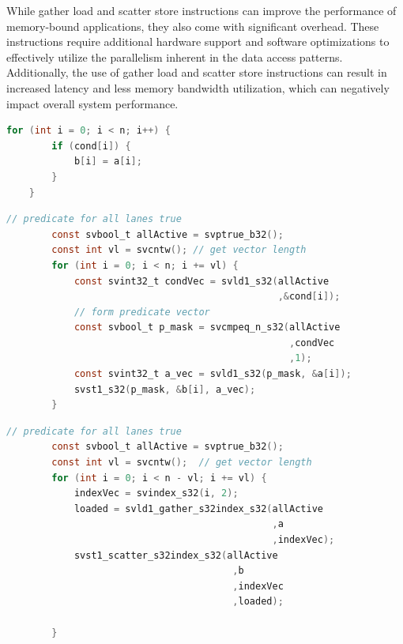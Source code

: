 \documentclass[\main/thesis.tex]{subfiles}
\begin{document}
While gather load and scatter store instructions can improve the performance of memory-bound applications, they also come with significant overhead. These instructions require additional hardware support and software optimizations to effectively utilize the parallelism inherent in the data access patterns. Additionally, the use of gather load and scatter store instructions can result in increased latency and less memory bandwidth utilization, which can negatively impact overall system performance.

\newpage

\begin{lstlisting}[language=C, caption=Scalar Code]
    for (int i = 0; i < n; i++) {
        if (cond[i]) {
            b[i] = a[i];
        }
    }
    \end{lstlisting}
    
    \begin{lstlisting}[language=C,caption=Vectorized Code]
        // predicate for all lanes true
        const svbool_t allActive = svptrue_b32(); 
        const int vl = svcntw(); // get vector length
        for (int i = 0; i < n; i += vl) {
            const svint32_t condVec = svld1_s32(allActive
                                                ,&cond[i]);
            // form predicate vector
            const svbool_t p_mask = svcmpeq_n_s32(allActive 
                                                  ,condVec
                                                  ,1); 
            const svint32_t a_vec = svld1_s32(p_mask, &a[i]);
            svst1_s32(p_mask, &b[i], a_vec); 
        }
    \end{lstlisting}
    
    \begin{lstlisting}[language=C,caption= Code Using Gather/Scatter]
        // predicate for all lanes true
        const svbool_t allActive = svptrue_b32(); 
        const int vl = svcntw();  // get vector length
        for (int i = 0; i < n - vl; i += vl) {
            indexVec = svindex_s32(i, 2);
            loaded = svld1_gather_s32index_s32(allActive
                                               ,a
                                               ,indexVec);
            svst1_scatter_s32index_s32(allActive
                                        ,b
                                        ,indexVec
                                        ,loaded);
    
        }
    \end{lstlisting}
    

\newpage
\end{document}
